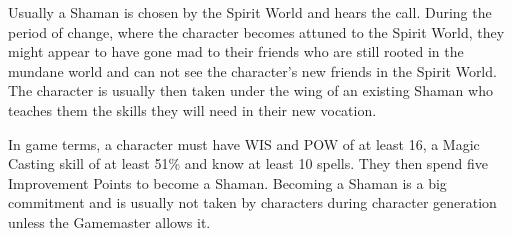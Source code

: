 Usually a Shaman is chosen by the Spirit World and hears the call. During the period of change, where the character becomes attuned to the Spirit World, they might appear to have gone mad to their friends who are still rooted in the mundane world and can not see the character’s new friends in the Spirit World.  The character is usually then taken under the wing of an existing Shaman who teaches them the skills they will need in their new vocation.

In game terms, a character must have WIS and POW of at least 16, a Magic Casting skill of at least 51\% and know at least 10 spells. They then spend five Improvement Points to become a Shaman. Becoming a Shaman is a big commitment and is usually not taken by characters during character generation unless the Gamemaster allows it.


